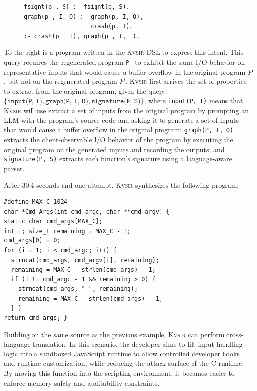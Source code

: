 \documentclass[sigplan,review,anonymous,10pt]{acmart}
\newcommand{\sys}{{\scshape Kv{\textalpha}sir}\xspace}
\newcommand{\ttt}[1]{\texttt{#1}\xspace}
\begin{document}
\begin{figure}
\vspace{-10pt}
\hspace{-10pt}
\begin{verbatim}
fsignt(p_, S) :- fsignt(p, S).
graph(p_, I, O) :- graph(p, I, O),
                   crash(p, I).
:- crash(p_, I), graph(p_, I, _).
\end{verbatim}
\end{figure}
To the right is a program written in the \sys DSL to express this intent.
This query requires the regenerated program \texttt{P\_} to exhibit the same
I/O behavior on representative inputs that would cause a buffer overflow in the original program $P$.
but not on the regenerated program $P^\prime$.
\sys first arrives the set of properties to extract from the
original program, given the query:
$\{\ttt{input(P, I)}, \ttt{graph(P, I, O)}, \ttt{signature(P, S)}\}$, where
\texttt{input(P, I)} means that \sys will use extract a set of inputs from the original program
by prompting an LLM with the program's source code and asking it to generate a set of inputs that
would cause a buffer overflow in the original program;
\texttt{graph(P, I, O)} extracts the client-observable I/O behavior of the program
by executing the original program on the generated inputs and recording the outputs;
and \texttt{signature(P, S)} extracts each function's signature using a language-aware parser.

After 30.4 seconds and one attempt, \sys synthesizes the following program:
\begin{verbatim}
#define MAX_C 1024
char *Cmd_Args(int cmd_argc, char **cmd_argv) {
static char cmd_args[MAX_C];
int i; size_t remaining = MAX_C - 1;
cmd_args[0] = 0;
for (i = 1; i < cmd_argc; i++) {
  strncat(cmd_args, cmd_argv[i], remaining);
  remaining = MAX_C - strlen(cmd_args) - 1;
  if (i != cmd_argc - 1 && remaining > 0) {
    strncat(cmd_args, " ", remaining);
    remaining = MAX_C - strlen(cmd_args) - 1;
  } }
return cmd_args; }
\end{verbatim}

Building on the same source as the previous example, \sys can perform
cross-language translation.
In this scenario, the developer aims to lift input
handling logic into a sandboxed JavaScript runtime to allow controlled
developer hooks and runtime customization, while reducing the attack surface of
the C runtime.
By moving this function into the scripting environment, it
becomes easier to enforce memory safety and auditability constraints.
\end{document}
